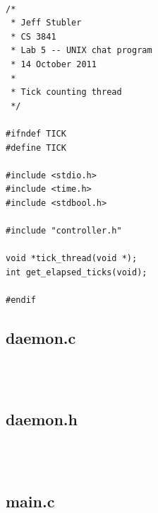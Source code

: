\documentclass{article}
\begin{document}
\begin{verbatim}

/*
 * Jeff Stubler
 * CS 3841
 * Lab 5 -- UNIX chat program
 * 14 October 2011
 *
 * Tick counting thread
 */

#ifndef TICK
#define TICK

#include <stdio.h>
#include <time.h>
#include <stdbool.h>

#include "controller.h"

void *tick_thread(void *);
int get_elapsed_ticks(void);

#endif

\end{verbatim}

\subsection*{daemon.c}

\begin{verbatim}



\end{verbatim}

\subsection*{daemon.h}

\begin{verbatim}



\end{verbatim}

\subsection*{main.c}

\begin{verbatim}



\end{verbatim}
\end{document}
